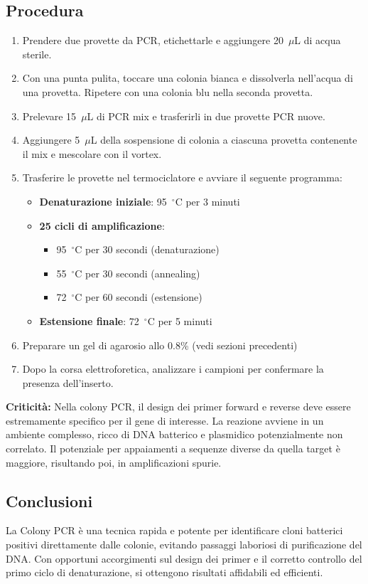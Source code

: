 \subsection{Procedura}
\begin{enumerate}\footnotesize
  \item Prendere due provette da PCR, etichettarle e aggiungere 20~$\mu$L di acqua sterile.
  \item Con una punta pulita, toccare una colonia bianca e dissolverla nell’acqua di una provetta. Ripetere con una colonia blu nella seconda provetta.
  \item Prelevare 15~$\mu$L di PCR mix e trasferirli in due provette PCR nuove.
  \item Aggiungere 5~$\mu$L della sospensione di colonia a ciascuna provetta contenente il mix e mescolare con il vortex.
  \item Trasferire le provette nel termociclatore e avviare il seguente programma:
    \begin{itemize}
      \item \textbf{Denaturazione iniziale}: 95~$^\circ$C per 3 minuti
      \item \textbf{25 cicli di amplificazione}:
        \begin{itemize}
          \item 95~$^\circ$C per 30 secondi (denaturazione)
          \item 55~$^\circ$C per 30 secondi (annealing)
          \item 72~$^\circ$C per 60 secondi (estensione)
        \end{itemize}
      \item \textbf{Estensione finale}: 72~$^\circ$C per 5 minuti
    \end{itemize}
  \item Preparare un gel di agarosio allo 0.8\% (vedi sezioni precedenti)
  \item Dopo la corsa elettroforetica, analizzare i campioni per confermare la presenza dell’inserto.
\end{enumerate}

\begin{criticitaBox}
  \textbf{Criticità:} Nella colony PCR, il design dei primer forward e reverse deve essere estremamente specifico per il gene di interesse. La reazione avviene in un ambiente complesso, ricco di DNA batterico e plasmidico potenzialmente non correlato. Il potenziale per appaiamenti a sequenze diverse da quella target è maggiore, risultando poi, in amplificazioni spurie.
\end{criticitaBox}

\subsection{Conclusioni}
\footnotesize{La Colony PCR è una tecnica rapida e potente per identificare cloni batterici positivi direttamente dalle colonie, evitando passaggi laboriosi di purificazione del DNA. Con opportuni accorgimenti sul design dei primer e il corretto controllo del primo ciclo di denaturazione, si ottengono risultati affidabili ed efficienti.}

\newpage

